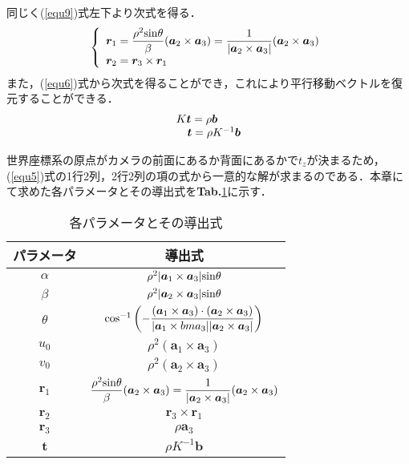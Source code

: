 \documentclass[a4paper,10pt]{jarticle}
\begin{document}
同じく(\ref{equ9})式左下より次式を得る．
%
\begin{equation}
 \left\{
  \begin{array}{l}
   {\bm r}_1 = \dfrac {{\rho}^2 {\rm sin} \theta}{\beta} ( {\bm a}_2 \times {\bm a}_3) = \dfrac{1}{|{\bm a}_2 \times {\bm a}_3|} ({\bm a}_2 \times {\bm a}_3) \\
   {\bm r}_2 = {\bm r}_3 \times {\bm r}_1\\
  \end{array}
 \right.
\label{equ11}
\end{equation}
%
また，(\ref{equ6})式から次式を得ることができ，これにより平行移動ベクトルを復元することができる．
%
\begin{equation}
 \begin{array}{l}
   K {\bm t} = \rho {\bm b} \\
   \hspace{3.5mm} {\bm t} = \rho K^{-1} {\bm b} \\
 \end{array}
\label{equ12}
\end{equation}

世界座標系の原点がカメラの前面にあるか背面にあるかで$ t_z $が決まるため，(\ref{equ5})式の1行2列，2行2列の項の式から一意的な解が求まるのである．本章にて求めた各パラメータとその導出式を{\bf Tab.}\ref{table1}に示す．
%
\begin{table}[htb]
  \begin{center}
    \caption{各パラメータとその導出式}
    \begin{tabular}{c|c} \hline
      パラメータ & 導出式 \\ \hline \hline
      $ \alpha $ & $ {\rho}^2 |{\bm a}_1 \times {\bm a}_3| {\rm sin} \theta $ \\ \hline
      $ \beta $ & $ {\rho}^2 |{\bm a}_2 \times {\bm a}_3| {\rm sin} \theta $ \\ \hline
      $ \theta $ & $ {\rm cos}^{-1} \left( - \dfrac{({\bm a}_1 \times {\bm a}_3) \cdot ({\bm a}_2 \times {\bm a}_3 )}{|{\bm a}_1 \times {bm a}_3 | | {\bm a}_2 \times {\bm a}_3| } \right) $ \\ \hline
      $ u_0 $ & $ {\rho}^2 ( {\bm a}_1 \times {\bm a}_3 ) $ \\ \hline
      $ v_0 $ & $ {\rho}^2 ( {\bm a}_2 \times {\bm a}_3 ) $ \\ \hline
      $ {\bm r}_1 $ & $ \dfrac {{\rho}^2 {\rm sin} \theta}{\beta} ( {\bm a}_2 \times {\bm a}_3) = \dfrac{1}{|{\bm a}_2 \times {\bm a}_3|} ({\bm a}_2 \times {\bm a}_3) $ \\ \hline
      $ {\bm r}_2 $ & $ {\bm r}_3 \times {\bm r}_1 $ \\ \hline
      $ {\bm r}_3 $ & $ \rho {\bm a}_3 $ \\ \hline
      $ {\bm t} $ & $ \rho K^{-1} {\bm b} $ \\ \hline
    \end{tabular}
    \label{table1}
  \end{center}
\end{table}
%
\end{document}
